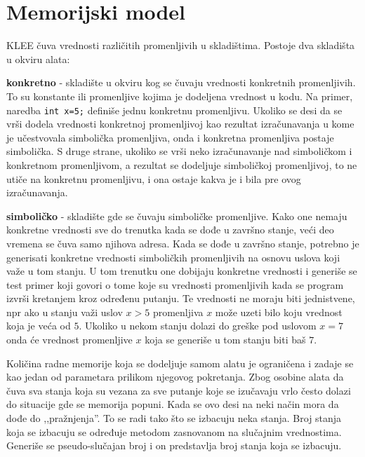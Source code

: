 \documentclass[12pt,oneside]{memoir}
\begin{document}
\section{Memorijski model} \label{memorija}
KLEE čuva vrednosti različitih promenljivih u skladištima. Postoje dva skladišta u okviru alata: 
\begin{description}
    \item \textbf{konkretno} - skladište u okviru kog se čuvaju vrednosti konkretnih promenljivih. To su konstante ili promenljive kojima je dodeljena vrednost u kodu. Na primer, naredba \texttt{int x=5;} definiše jednu konkretnu promenljivu. Ukoliko se desi da se vrši dodela vrednosti konkretnoj promenljivoj kao rezultat izračunavanja u kome je učestvovala simbolička promenljiva, onda i konkretna promenljiva postaje simbolička. S druge strane, ukoliko se vrši neko izračunavanje nad simboličkom i konkretnom promenljivom, a rezultat se dodeljuje simboličkoj promenljivoj, to ne utiče na konkretnu promenljivu, i ona ostaje kakva je i bila pre ovog izračunavanja.
    
    \item \textbf{simboličko} - skladište gde se čuvaju simboličke promenljive. Kako one nemaju konkretne vrednosti sve do trenutka kada se dođe u završno stanje, veći deo vremena se čuva samo njihova adresa. Kada se dođe u završno stanje, potrebno je generisati konkretne vrednosti simboličkih promenljivih na osnovu uslova koji važe u tom stanju. U tom trenutku one dobijaju konkretne vrednosti i generiše se test primer koji govori o tome koje su vrednosti promenljivih kada se program izvrši kretanjem kroz određenu putanju. Te vrednosti ne moraju biti jednistvene, npr ako u stanju važi uslov $x > 5$ promenljiva $x$ može uzeti bilo koju vrednost koja je veća od $5$. Ukoliko u nekom stanju dolazi do greške pod uslovom $x = 7$ onda će vrednost promenljive $x$ koja se generiše u tom stanju biti baš $7$.
\end{description}
\bigskip
Količina radne memorije koja se dodeljuje samom alatu je ograničena i zadaje se kao jedan od parametara prilikom njegovog pokretanja. Zbog osobine alata da čuva sva stanja koja su vezana za sve putanje koje se izučavaju vrlo često dolazi do situacije gde se memorija popuni. Kada se ovo desi na neki način mora da dođe do ,,pražnjenja''. To se radi tako što se izbacuju neka stanja. Broj stanja koja se izbacuju se određuje metodom zasnovanom na slučajnim vrednostima. Generiše se pseudo-slučajan broj i on predstavlja broj stanja koja se izbacuju. 
\end{document}
